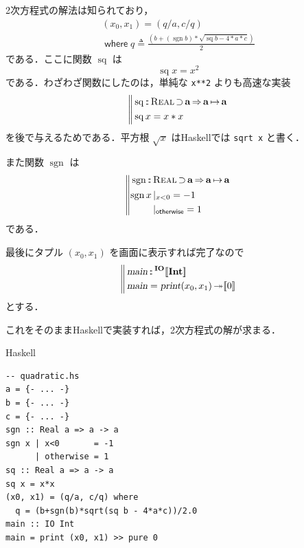 \documentclass[a5paper,twoside,fleqn,draft]{jsbook}
\def\[{[\![}
\def\]{]\!]}
\DeclareMathOperator{\sgn}{sgn}
\newcommand{\programminglanguage}[1]{\textsf{#1}}
\newcommand{\haskell}{\programminglanguage{Haskell}}
\newcommand{\code}[1]{\texttt{#1}}
\newenvironment{haskellcode}{\begin{itembox}[r]{\haskell}}{\end{itembox}}
\newcommand{\mBrace}{\Vert}
\newcommand{\mKeyword}[1]{\mathsf{#1}}
\newcommand{\mOtherwiseKeyword}{\mKeyword{otherwise}}
\newcommand{\mWhereKeyword}{\mKeyword{where}}
\DeclareMathOperator{\mOtherwise}{\mOtherwiseKeyword}
\DeclareMathOperator{\mSuperClass}{\Rightarrow}
\DeclareMathOperator{\mSuperSet}{\supset}
\DeclareMathOperator{\mWhere}{\mWhereKeyword}
\newcommand{\mSpecialFunc}[1]{#1}
\DeclareMathOperator{\mSq}{\mSpecialFunc{sq}}
\newcommand{\mAction}[1]{\textsl{#1}}
\DeclareMathOperator{\mMain}{\mAction{main}}
\DeclareMathOperator{\mPrint}{\mAction{print}}
\DeclareMathOperator{\mBindRightIgnore}{\twoheadrightarrow}
\DeclareMathOperator{\mIn}{{:\!:}}
\DeclareMathOperator{\mLetEq}{\triangleq}
\DeclareMathOperator{\mMapsTo}{\mapsto}
\newcommand{\mType}[1]{\mathbf{#1}} %
\newcommand{\mA}{\mType{a}}
\newcommand{\mIntType}{\mType{Int}}
\newcommand{\mTypeAssemble}[2]{{}^\mType{#1}\[\mType{#2}\]}
\newcommand{\mIOType}[1]{\mTypeAssemble{IO}{#1}}
\newcommand{\mIOIntType}{\mIOType{\mIntType}}
\newcommand{\mPureWith}[1]{\[#1\]}
\newcommand{\mTypeClass}[1]{\textsc{#1}} %
\newcommand{\mRealTypeClass}{\mTypeClass{Real}}
\newcommand{\mGuard}[1]{\mathop{\mid_{#1}}}
\newcommand{\mProjEXP}[2]{#1\mMapsTo#2} %
\begin{document}
2次方程式の解法は知られており，
\begin{multline}
  (x_0,x_1)=(q/a,c/q)\\
  \mWhere q\mLetEq\frac{\left(b+(\sgn b)*\sqrt{\mSq b-4*a*c}\right)}{2}
\end{multline}
である．ここに関数 $\mSq$ は
\begin{equation}
  \mSq x=x^2
\end{equation}
である．わざわざ関数にしたのは，単純な \code{x**2} よりも高速な実装
\begin{equation}
  \left\mBrace
  \begin{aligned}
    &\mSq\mIn\mRealTypeClass\mSuperSet\mA
    \mSuperClass\mProjEXP{\mA}{\mA}\\
    &\mSq x=x*x
  \end{aligned}
  \right.
\end{equation}
を後で与えるためである．平方根 $\sqrt{x}$ は\haskell では \code{sqrt
  x} と書く．

また関数 $\sgn$ は
\begin{equation}
  \left\mBrace
  \begin{aligned}
    {}&\sgn\mIn{}\mRealTypeClass\mSuperSet\mA
    \mSuperClass\mProjEXP{\mA }{\mA }\\
    {}&
    \begin{aligned}
      \sgn x&\mGuard{x<0}=-1\\
      &\mGuard{\mOtherwise}=1
    \end{aligned}
  \end{aligned}
  \right.
\end{equation}
である．

最後にタプル $(x_0,x_1)$ を画面に表示すれば完了なので
\begin{equation}
  \left\mBrace
  \begin{aligned}
    {}&\mMain\mIn\mIOIntType\\
    {}&\mMain=\mPrint(x_0,x_1)\mBindRightIgnore\mPureWith{0}
  \end{aligned}
  \right.
\end{equation}
とする．

これをそのまま\haskell で実装すれば，2次方程式の解が求まる．
\begin{haskellcode}
\begin{verbatim}
-- quadratic.hs
a = {- ... -}
b = {- ... -}
c = {- ... -}
sgn :: Real a => a -> a
sgn x | x<0       = -1
      | otherwise = 1
sq :: Real a => a -> a
sq x = x*x
(x0, x1) = (q/a, c/q) where
  q = (b+sgn(b)*sqrt(sq b - 4*a*c))/2.0
main :: IO Int
main = print (x0, x1) >> pure 0
\end{verbatim}
\end{haskellcode}
\end{document}

